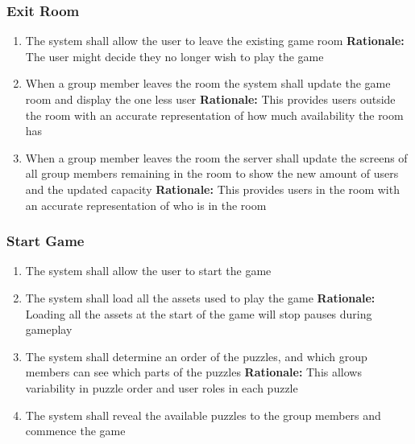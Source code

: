 \documentclass[12pt]{article}
\begin{document}
\subsubsection{Exit Room}
\begin{enumerate}[label=ER\arabic*., series=ExitRoom]
    \item The system shall allow the user to leave the existing game room\newline 
    \textbf{Rationale:} The user might decide they no longer wish to play the game
    \item When a group member leaves the room the system shall update the game room and display the one less user\newline 
    \textbf{Rationale:} This provides users outside the room with an accurate representation of how much availability the room has
    \item When a group member leaves the room the server shall update the screens of all group members remaining in the room to show the new amount of users and the updated capacity\newline 
    \textbf{Rationale:} This provides users in the room with an accurate representation of who is in the room
\end{enumerate}


\subsubsection{Start Game}
\begin{enumerate}[label=ST\arabic*., series=StartGame]
	\item The system shall allow the user to start the game
    \item The system shall load all the assets used to play the game\newline 
    \textbf{Rationale:} Loading all the assets at the start of the game will stop pauses during gameplay
    \item The system shall determine an order of the puzzles, and which group members can see which parts of the puzzles\newline 
    \textbf{Rationale:} This allows variability in puzzle order and user roles in each puzzle
    \item The system shall reveal the available puzzles to the group members and commence the game 
\end{enumerate}
\end{document}
